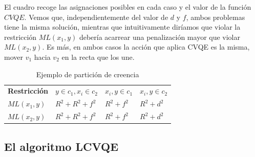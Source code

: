 El cuadro  recoge las asignaciones posibles en cada caso y el valor de la función $CVQE$. Vemos que, independientemente del valor de $d$ y $f$, ambos problemas tiene la misma solución, mientras que intuitivamente diríamos que violar la restricción $ML(x_1, y)$ debería acarrear una penalización mayor que violar $ML(x_2, y)$. Es más, en ambos casos la acción que aplica \acs{CVQE} es la misma, mover $v_1$ hacia $v_2$ en la recta que los une.

\begin{table}[!h]
	\centering
	\setlength{\arrayrulewidth}{1mm}
	\setlength{\tabcolsep}{10pt}
	\renewcommand{\arraystretch}{0.9}
	
	\begin{tabular}{ >{\centering\arraybackslash}m{2cm}  >{\centering\arraybackslash}m{2.5cm}>{\centering\arraybackslash}m{2cm}>{\centering\arraybackslash}m{2cm}}
		\hline
		\rowcolor{black}
		\multicolumn{4}{c}{\bf \color{white}{Valores de CVQE}}\\
		\hline
		\rowcolor{gray!50}
		\textbf{Restricción} & \textbf{$y \in c_1, x_i \in c_2$} & \textbf{$x_i,y \in c_1$} & \textbf{$x_i,y \in c_2$}  \\
		$ML(x_1, y)$ & $R^2 + R^2 + f^2$ & $R^2 + f^2 $ & $R^2 + d^2 $  \\
		$ML(x_2, y)$ & $R^2 + R^2 + f^2$ & $R^2 + f^2 $ & $R^2 + d^2 $  \\
		\hline
		
	\end{tabular}
	\caption[Ejemplo de partición de creencia]{Ejemplo de partición de creencia \cite{CECM:2012}}
	\label{tab:tabla3}
\end{table}

\subsection{El algoritmo LCVQE}

















